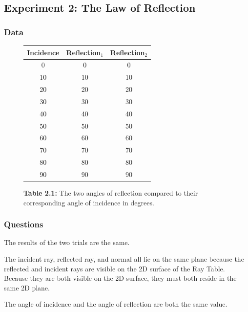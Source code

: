 \documentclass[12pt]{article}
\begin{document}
\subsection{Experiment 2: The Law of Reflection}

\subsubsection{Data}

\begin{figure}[H]
  \label{tab:2.1}
  \caption{\textbf{Table 2.1:} The two angles of reflection compared to their
    corresponding angle of incidence in degrees.}
  \begin{center}
    \begin{tabular}{|c|c|c|}
      \hline
      Incidence & Reflection\(_1\) & Reflection\(_2\) \\
      \hline
      0 & 0 & 0 \\   
      10 & 10 & 10 \\
      20 & 20 & 20 \\
      30 & 30 & 30 \\
      40 & 40 & 40 \\
      50 & 50 & 50 \\
      60 & 60 & 60 \\
      70 & 70 & 70 \\
      80 & 80 & 80 \\
      90 & 90 & 90 \\
      \hline
    \end{tabular}
  \end{center}
\end{figure}

\subsubsection{Questions}

\subsubsubsection{}

The results of the two trials are the same.

\subsubsubsection{}

The incident ray, reflected ray, and normal all lie on the same plane because
the reflected and incident rays are visible on the 2D surface of the Ray
Table. Because they are both visible on the 2D surface, they must both reside in
the same 2D plane.

\subsubsubsection{}

The angle of incidence and the angle of reflection are both the same value. 
 
\end{document}
